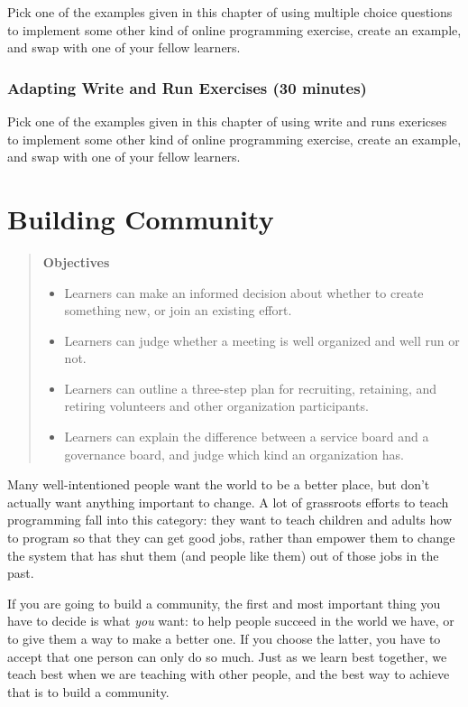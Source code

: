 \documentclass[10pt,statementpaper]{memoir}
\providecommand{\tightlist}{%
  \setlength{\itemsep}{0pt}\setlength{\parskip}{0pt}}
\begin{document}
Pick one of the examples given in this chapter of using multiple choice
questions to implement some other kind of online programming exercise,
create an example, and swap with one of your fellow learners.

\subsection*{Adapting Write and Run Exercises (30
minutes)}\label{adapting-write-and-run-exercises-30-minutes}

Pick one of the examples given in this chapter of using write and runs
exericses to implement some other kind of online programming exercise,
create an example, and swap with one of your fellow learners.

\chapter{Building Community}\label{building-community}

\begin{quote}
\textbf{Objectives}

\begin{itemize}
\tightlist
\item
  Learners can make an informed decision about whether to create
  something new, or join an existing effort.
\item
  Learners can judge whether a meeting is well organized and well run or
  not.
\item
  Learners can outline a three-step plan for recruiting, retaining, and
  retiring volunteers and other organization participants.
\item
  Learners can explain the difference between a service board and a
  governance board, and judge which kind an organization has.
\end{itemize}
\end{quote}

Many well-intentioned people want the world to be a better place, but
don't actually want anything important to change. A lot of grassroots
efforts to teach programming fall into this category: they want to teach
children and adults how to program so that they can get good jobs,
rather than empower them to change the system that has shut them (and
people like them) out of those jobs in the past.

If you are going to build a community, the first and most important
thing you have to decide is what \emph{you} want: to help people succeed
in the world we have, or to give them a way to make a better one. If you
choose the latter, you have to accept that one person can only do so
much. Just as we learn best together, we teach best when we are teaching
with other people, and the best way to achieve that is to build a
community.
\end{document}
